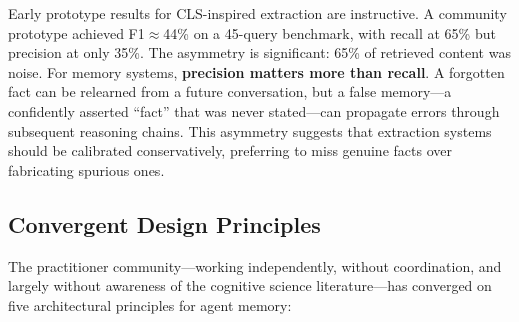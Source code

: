 Early prototype results for CLS-inspired extraction are instructive.
A community prototype achieved F1$\approx$44\% on a 45-query
benchmark, with recall at 65\% but precision at only 35\%.  The
asymmetry is significant: 65\% of retrieved content was noise.  For
memory systems, \textbf{precision matters more than recall}.  A
forgotten fact can be relearned from a future conversation, but a false
memory---a confidently asserted ``fact'' that was never stated---can
propagate errors through subsequent reasoning chains.  This asymmetry
suggests that extraction systems should be calibrated conservatively,
preferring to miss genuine facts over fabricating spurious ones.

\subsection{Convergent Design Principles}
\label{sec:memorymd-convergence}

The practitioner community---working independently, without
coordination, and largely without awareness of the cognitive science
literature---has converged on five architectural principles for agent
memory:

